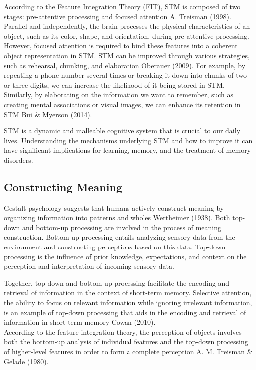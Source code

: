 \documentclass[print]{nuthesis}
\begin{document}
According to the Feature Integration Theory (FIT), STM is composed of two stages: pre-attentive processing and focused attention A. Treisman (1998).
Parallel and independently, the brain processes the physical characteristics of an object, such as its color, shape, and orientation, during pre-attentive processing.
However, focused attention is required to bind these features into a coherent object representation in STM.
STM can be improved through various strategies, such as rehearsal, chunking, and elaboration Oberauer (2009).
For example, by repeating a phone number several times or breaking it down into chunks of two or three digits, we can increase the likelihood of it being stored in STM.
Similarly, by elaborating on the information we want to remember, such as creating mental associations or visual images, we can enhance its retention in STM Bui \& Myerson (2014).

STM is a dynamic and malleable cognitive system that is crucial to our daily lives.
Understanding the mechanisms underlying STM and how to improve it can have significant implications for learning, memory, and the treatment of memory disorders.

\hypertarget{constructing-meaning}{%
\subsection{Constructing Meaning}\label{constructing-meaning}}

Gestalt psychology suggests that humans actively construct meaning by organizing information into patterns and wholes Wertheimer (1938).
Both top-down and bottom-up processing are involved in the process of meaning construction.
Bottom-up processing entails analyzing sensory data from the environment and constructing perceptions based on this data.
Top-down processing is the influence of prior knowledge, expectations, and context on the perception and interpretation of incoming sensory data.

Together, top-down and bottom-up processing facilitate the encoding and retrieval of information in the context of short-term memory.
Selective attention, the ability to focus on relevant information while ignoring irrelevant information, is an example of top-down processing that aids in the encoding and retrieval of information in short-term memory Cowan (2010).\\
According to the feature integration theory, the perception of objects involves both the bottom-up analysis of individual features and the top-down processing of higher-level features in order to form a complete perception A. M. Treisman \& Gelade (1980).
\end{document}

